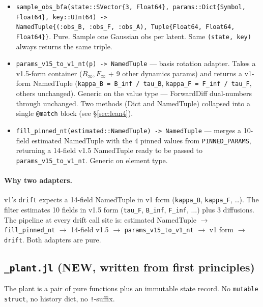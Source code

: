 \documentclass[11pt,a4paper]{article}
\begin{document}
\begin{itemize}[itemsep=2pt,leftmargin=*]
\item \texttt{sample\_obs\_bfa(state::SVector\{3, Float64\},
  params::Dict\{Symbol, Float64\}, key::UInt64) ->\\ NamedTuple\{(:obs\_B,
  :obs\_F, :obs\_A), Tuple\{Float64, Float64, Float64\}\}}.
  Pure. Sample one Gaussian obs per latent. Same \texttt{(state,
  key)} always returns the same triple.

\item \texttt{params\_v15\_to\_v1\_nt(p) -> NamedTuple} --- basis
  rotation adapter. Takes a v1.5-form container ($B_\infty, F_\infty$
  + 9 other dynamics params) and returns a v1-form NamedTuple
  (\texttt{kappa\_B = B\_inf / tau\_B}, \texttt{kappa\_F = F\_inf
  / tau\_F}, others unchanged). Generic on the value type ---
  ForwardDiff dual-numbers through unchanged. Two methods (Dict and
  NamedTuple) collapsed into a single \texttt{@match} block (see §\ref{sec:lean4}).

\item \texttt{fill\_pinned\_nt(estimated::NamedTuple) -> NamedTuple}
  --- merges a 10-field estimated NamedTuple with the 4 pinned
  values from \texttt{PINNED\_PARAMS}, returning a 14-field v1.5
  NamedTuple ready to be passed to \texttt{params\_v15\_to\_v1\_nt}.
  Generic on element type.
\end{itemize}

\paragraph{Why two adapters.}
v1's \texttt{drift} expects a 14-field NamedTuple in v1 form
(\texttt{kappa\_B}, \texttt{kappa\_F}, \dots). The filter
estimates 10 fields in v1.5 form (\texttt{tau\_F},
\texttt{B\_inf}, \texttt{F\_inf}, $\dots$) plus 3 diffusions. The
pipeline at every drift call site is: estimated NamedTuple
$\to$ \texttt{fill\_pinned\_nt} $\to$ 14-field v1.5 $\to$
\texttt{params\_v15\_to\_v1\_nt} $\to$ v1 form $\to$
\texttt{drift}. Both adapters are pure.

\subsection{\texttt{\_plant.jl} (NEW, written from first principles)}

The plant is a pair of pure functions plus an immutable state
record. No \texttt{mutable struct}, no history dict, no
\texttt{!}-suffix.
\end{document}
